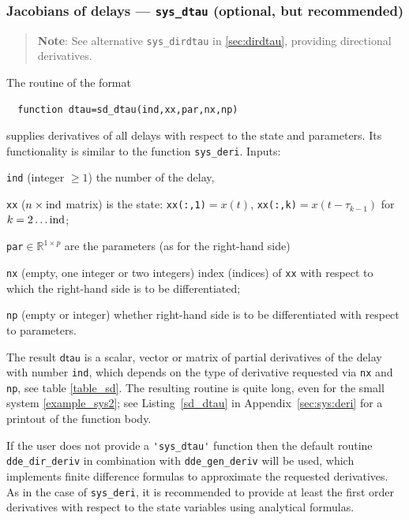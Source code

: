\documentclass[10pt]{scrartcl}
\newcommand{\parm}[1]{\mathsf{#1}}
\newcommand{\RR}{\mathbb{R}}
\newcommand{\blist}[1]{\mbox{\lstinline!#1!}}
\begin{document}
\subsubsection{Jacobians of delays ---
  \texorpdfstring{\blist{sys_dtau}}{sys\_dtau} ({}optional, but
  recommended)}
\label{sec:sddtau}
\begin{quote}
  \textbf{Note}: See alternative \blist{sys_dirdtau} in
  \cref{sec:dirdtau}, providing directional derivatives.
\end{quote}
The routine of the format
\begin{lstlisting}
  function dtau=sd_dtau(ind,xx,par,nx,np)
\end{lstlisting}
supplies derivatives of all delays with respect to the state and
parameters. Its functionality is similar to the function
\blist{sys_deri}. Inputs:
\begin{compactitem}
\item \blist{ind} (integer $\geq1$) the number of the delay,
\item \blist{xx} ($n\times\blist{ind}$ matrix) is the state:
  \blist{xx(:,1)}$=x(t)$, \blist{xx(:,k)}$=x(t-\tau_{k-1})$ for
  $k=2\ldots\blist{ind}$;
\item \blist{par}$\in\RR^{1\times p}$ are the parameters (as for the right-hand side)
\item \blist{nx} (empty, one integer or two integers) index (indices) of
  \blist{xx} with respect to which the right-hand side is to be
  differentiated;
\item \blist{np} (empty or integer) whether right-hand side is to be
  differentiated with respect to parameters.
\end{compactitem}
The result $\parm{dtau}$ is a scalar, vector or matrix of partial
derivatives of the delay with number \blist{ind}, which depends on the
type of derivative requested via \blist{nx} and \blist{np}, see table
\ref{table_sd}. The resulting routine is quite long, even for the small system
\eqref{example_sys2}; see Listing~\ref{sd_dtau} in
Appendix~\ref{sec:sys:deri} for a printout of the function body.

If the user does not provide a \blist{'sys_dtau'} function then the
default routine \blist{dde_dir_deriv} in combination with
\blist{dde_gen_deriv} will be used, which implements finite difference
formulas to approximate the requested derivatives. As in the case of
\blist{sys_deri}, it is recommended to provide at least the first
order derivatives with respect to the state variables using analytical
formulas.
\end{document}
